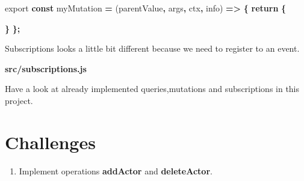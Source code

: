 \documentclass[]{book}
\newenvironment{Shaded}{\begin{snugshade}}{\end{snugshade}}
\newcommand{\KeywordTok}[1]{\textcolor[rgb]{0.13,0.29,0.53}{\textbf{#1}}}
\newcommand{\DataTypeTok}[1]{\textcolor[rgb]{0.13,0.29,0.53}{#1}}
\newcommand{\SpecialCharTok}[1]{\textcolor[rgb]{0.00,0.00,0.00}{#1}}
\newcommand{\VerbatimStringTok}[1]{\textcolor[rgb]{0.31,0.60,0.02}{#1}}
\newcommand{\ImportTok}[1]{#1}
\newcommand{\VariableTok}[1]{\textcolor[rgb]{0.00,0.00,0.00}{#1}}
\newcommand{\ControlFlowTok}[1]{\textcolor[rgb]{0.13,0.29,0.53}{\textbf{#1}}}
\newcommand{\OperatorTok}[1]{\textcolor[rgb]{0.81,0.36,0.00}{\textbf{#1}}}
\newcommand{\AttributeTok}[1]{\textcolor[rgb]{0.77,0.63,0.00}{#1}}
\newcommand{\NormalTok}[1]{#1}
\providecommand{\tightlist}{%
  \setlength{\itemsep}{0pt}\setlength{\parskip}{0pt}}
\begin{document}
\begin{Shaded}
\begin{Highlighting}[]
\ImportTok{export} \KeywordTok{const}\NormalTok{ myMutation }\OperatorTok{=}\NormalTok{ (parentValue}\OperatorTok{,}\NormalTok{ args}\OperatorTok{,}\NormalTok{ ctx}\OperatorTok{,}\NormalTok{ info) }\OperatorTok{=>} \OperatorTok{\{}
    \ControlFlowTok{return} \OperatorTok{\{}
              
    \OperatorTok{\}}
\OperatorTok{\};}
\end{Highlighting}
\end{Shaded}

Subscriptions looks a little bit different because we need to register
to an event.

\textbf{src/subscriptions.js}

\begin{Shaded}
\end{Shaded}

Have a look at already implemented queries,mutations and subscriptions
in this project.

\section{Challenges}\label{challenges-2}

\begin{enumerate}
\def\labelenumi{\arabic{enumi}.}
\tightlist
\item
  Implement operations \textbf{addActor} and \textbf{deleteActor}.
\end{enumerate}
\end{document}
